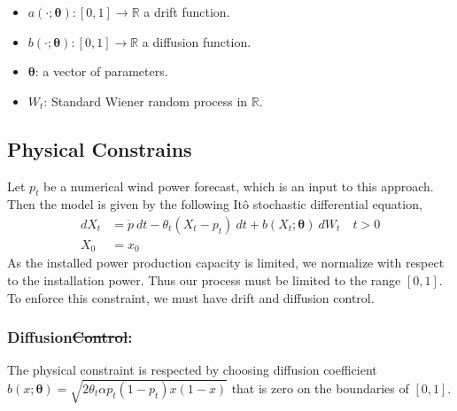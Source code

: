 \documentclass[ima, 20pt, portrait, plainboxedsections]{sciposter}
\newcommand{\R}{\mathbb{R}}
\providecommand{\DIFadd}[1]{{\protect\color{blue}\uwave{#1}}} %
\providecommand{\DIFdel}[1]{{\protect\color{red}\sout{#1}}}                      %
\providecommand{\DIFaddbegin}{} %
\providecommand{\DIFaddend}{} %
\providecommand{\DIFdelbegin}{} %
\providecommand{\DIFdelend}{} %
\begin{document}
\begin{multicols}{3}
 \begin{itemize} 
\item $a(\cdot; \bm{\theta}):[0,1] \to \R $  a drift function.
\item $b (\cdot; \bm{\theta} ):[0,1] \to \R$  a  diffusion function.
\item $\bm{\theta}$: a vector of parameters.
\item $W_t$: Standard Wiener random process in $\R$.
 \end{itemize} 

\subsection*{Physical Constrains}
Let $p_t$ be a numerical wind power forecast, which is an input to this approach. Then the model is given by the following It\^{o} stochastic differential equation,
\begin{equation}
\begin{split}
dX_t&= \dot{p} \ dt - \theta_t( X_t- p_t) \ dt + b (X_t; \bm{\theta} ) \ dW_t \quad t > 0 \\
X_0&=x_0
\end{split}
\end{equation}
As the  installed power production capacity is limited, we normalize with respect to the installation power. Thus our process must be limited to the range $[0,1]$. To enforce this constraint, we must have drift and diffusion control.
\subsubsection*{Diffusion\DIFdelbegin \DIFdel{Control}\DIFdelend : } The physical constraint is respected  by choosing  diffusion coefficient \DIFdelbegin \DIFdel{$ b (x; \bm{\theta} )= \sqrt{2 \theta_t \alpha p_t(1-p_t) x (1-x)} $ }\DIFdelend \DIFaddbegin \DIFadd{$ b (x; \bm{\theta} )= \sqrt{2 \theta_t \alpha x (1-x)} $ }\DIFaddend that is zero on the boundaries of $[0,1]$.

\end{multicols}
\end{document}
